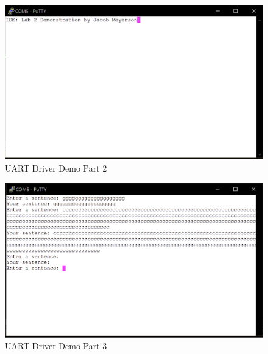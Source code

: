 \documentclass[CMPE]{KGCOEReport}
\begin{document}
\begin{figure}[H]
	\centering
  	\includegraphics[width=1.0\textwidth]{Screenshots/UART_lab_part_2}  
	\caption{UART Driver Demo Part 2}
	\label{Figure 1}
\end{figure}

\begin{figure}[H]
	\centering
  	\includegraphics[width=1.0\textwidth]{Screenshots/UART_lab_part_3}  
	\caption{UART Driver Demo Part 3}
	\label{Figure 2}
\end{figure}

\newpage

\end{document}
